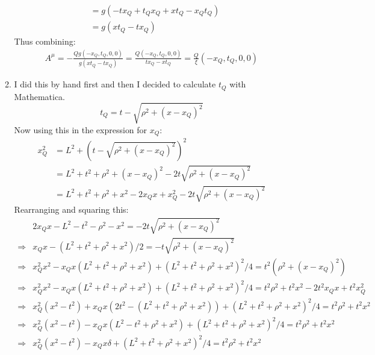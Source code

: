 \documentclass[12pt,a4]{article}
\begin{document}
\begin{enumerate}
\begin{enumerate}
\begin{align*}
                      &= g(-t x_Q + t_Qx_Q +x t_Q - x_Qt_Q)\\
                      &= g(x t_Q -t x_Q)
        \end{align*}
        Thus combining:
        \begin{align*}
          A^\mu = - \frac{Q g (-x_Q, t_Q, 0, 0)}{g(x t_Q -t x_Q)} = \frac{Q  (-x_Q, t_Q, 0, 0)}{t x_Q - x t_Q} = \frac{Q}{\xi} (-x_Q, t_Q, 0, 0)
        \end{align*}
      \item
        I did this by hand first and then I decided to calculate $t_Q$ with Mathematica.
        \begin{equation*}
          t_Q = t - \sqrt{\rho^2 + (x - x_Q)^2}
        \end{equation*}
        Now using this in the expression for $x_Q$:
        \begin{align*}
          x_Q^2 &= L^2 + \left(t - \sqrt{\rho^2 + (x - x_Q)^2}\right)^2\\
                &= L^2 + t^2 + \rho^2 + (x - x_Q)^2 - 2 t \sqrt{\rho^2 + (x - x_Q)^2}\\
                &= L^2 + t^2 + \rho^2 + x^2 - 2x_Qx + x_Q^2 - 2 t \sqrt{\rho^2 + (x - x_Q)^2}
        \end{align*}
        Rearranging and squaring this:
        \begin{align*}
                      & 2x_Qx - L^2 - t^2 - \rho^2 - x^2 = -2 t \sqrt{\rho^2 + (x - x_Q)^2}\\
          \Rightarrow & x_Qx - (L^2 + t^2 + \rho^2 + x^2)/2 = - t \sqrt{\rho^2 + (x - x_Q)^2}\\
          \Rightarrow & x_Q^2x^2 - x_Qx (L^2 + t^2 + \rho^2 + x^2) + (L^2 + t^2 + \rho^2 + x^2)^2/4 = t^2 (\rho^2 + (x - x_Q)^2)\\
          \Rightarrow & x_Q^2x^2 - x_Qx (L^2 + t^2 + \rho^2 + x^2) + (L^2 + t^2 + \rho^2 + x^2)^2/4 = t^2 \rho^2 + t^2 x^2 - 2 t^2x_Qx + t^2x_Q^2\\
          \Rightarrow & x_Q^2(x^2 - t^2) + x_Qx (2t^2 - (L^2 + t^2 + \rho^2 + x^2)) + (L^2 + t^2 + \rho^2 + x^2)^2/4 = t^2 \rho^2 + t^2 x^2 \\
          \Rightarrow & x_Q^2(x^2 - t^2) - x_Qx (L^2 - t^2 + \rho^2 + x^2) + (L^2 + t^2 + \rho^2 + x^2)^2/4 = t^2 \rho^2 + t^2 x^2 \\
          \Rightarrow & x_Q^2(x^2 - t^2) - x_Qx \delta + (L^2 + t^2 + \rho^2 + x^2)^2/4 = t^2 \rho^2 + t^2 x^2 \\
        \end{align*}

\end{enumerate}
\end{enumerate}
\end{document}
